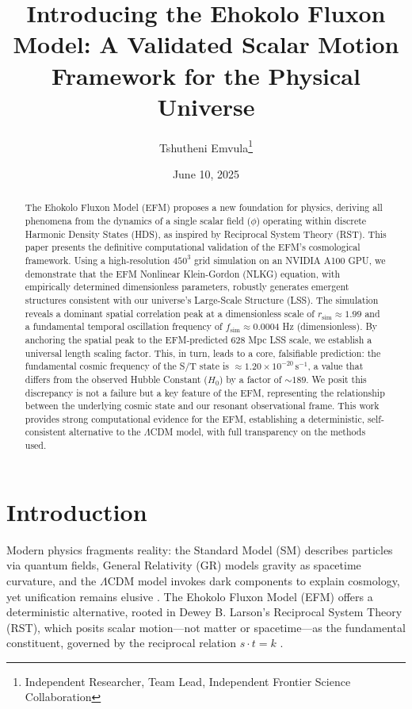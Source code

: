 \documentclass[11pt]{article}
\title{Introducing the Ehokolo Fluxon Model: A Validated Scalar Motion Framework for the Physical Universe}
\author{Tshutheni Emvula\thanks{Independent Researcher, Team Lead, Independent Frontier Science Collaboration}}
\date{June 10, 2025}
\begin{document}
\maketitle

\begin{abstract}
The Ehokolo Fluxon Model (EFM) proposes a new foundation for physics, deriving all phenomena from the dynamics of a single scalar field (\(\phi\)) operating within discrete Harmonic Density States (HDS), as inspired by Reciprocal System Theory (RST). This paper presents the definitive computational validation of the EFM's cosmological framework. Using a high-resolution \(450^3\) grid simulation on an NVIDIA A100 GPU, we demonstrate that the EFM Nonlinear Klein-Gordon (NLKG) equation, with empirically determined dimensionless parameters, robustly generates emergent structures consistent with our universe's Large-Scale Structure (LSS). The simulation reveals a dominant spatial correlation peak at a dimensionless scale of \(r_{\text{sim}} \approx 1.99\) and a fundamental temporal oscillation frequency of \(f_{\text{sim}} \approx 0.0004\) Hz (dimensionless). By anchoring the spatial peak to the EFM-predicted 628 Mpc LSS scale, we establish a universal length scaling factor. This, in turn, leads to a core, falsifiable prediction: the fundamental cosmic frequency of the S/T state is \(\approx 1.20 \times 10^{-20} \, \text{s}^{-1}\), a value that differs from the observed Hubble Constant (\(H_0\)) by a factor of \(\sim 189\). We posit this discrepancy is not a failure but a key feature of the EFM, representing the relationship between the underlying cosmic state and our resonant observational frame. This work provides strong computational evidence for the EFM, establishing a deterministic, self-consistent alternative to the \(\Lambda\)CDM model, with full transparency on the methods used.
\end{abstract}

\section{Introduction}
Modern physics fragments reality: the Standard Model (SM) describes particles via quantum fields, General Relativity (GR) models gravity as spacetime curvature, and the \(\Lambda\)CDM model invokes dark components to explain cosmology, yet unification remains elusive \citep{planck2018,riess2022}. The Ehokolo Fluxon Model (EFM) offers a deterministic alternative, rooted in Dewey B. Larson’s Reciprocal System Theory (RST), which posits scalar motion—not matter or spacetime—as the fundamental constituent, governed by the reciprocal relation \(s \cdot t = k\) \citep{larson1959}.
\end{document}
